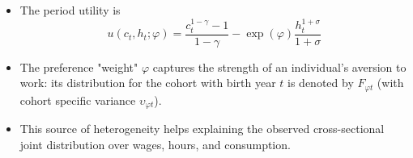 \documentclass[notes=show]{beamer}
\begin{document}
\bigskip

\begin{frame}%



\begin{itemize}
\item The period utility is%
\begin{equation}
u\left( c_{t},h_{t};\varphi \right) =\frac{c_{t}^{1-\gamma }-1}{1-\gamma }%
-\exp \left( \varphi \right) \frac{h_{t}^{1+\sigma }}{1+\sigma }
\end{equation}

\item The preference "weight" $\varphi $ captures the strength of an
individual's aversion to work: its distribution for the cohort with birth
year $t$ is denoted by $F_{\varphi t}$ (with cohort specific variance $%
\upsilon _{\varphi t}$).

\item This source of heterogeneity helps explaining the observed
cross-sectional joint distribution over wages, hours, and consumption.
\end{itemize}

\transboxout%
\end{frame}%

\bigskip
\end{document}
